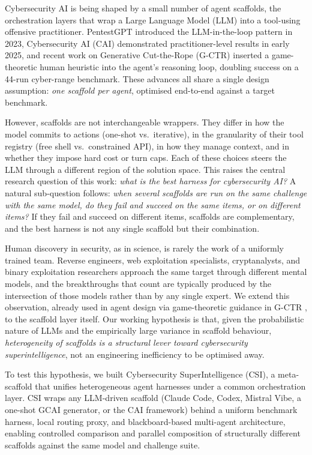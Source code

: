Cybersecurity AI is being shaped by a small number of agent scaffolds, the orchestration layers that wrap a Large Language Model (LLM) into a tool-using offensive practitioner. PentestGPT \cite{deng2024pentestgpt,mayoral2025offensive} introduced the LLM-in-the-loop pattern in 2023, Cybersecurity AI (CAI) \cite{mayoral2025cai} demonstrated practitioner-level results in early 2025, and recent work on Generative Cut-the-Rope (G-CTR) \cite{mayoralvilches2025gametheoretic} inserted a game-theoretic human heuristic into the agent's reasoning loop, doubling success on a 44-run cyber-range benchmark. These advances all share a single design assumption: \emph{one scaffold per agent}, optimised end-to-end against a target benchmark.

However, scaffolds are not interchangeable wrappers. They differ in how the model commits to actions (one-shot vs.\ iterative), in the granularity of their tool registry (free shell vs.\ constrained API), in how they manage context, and in whether they impose hard cost or turn caps. Each of these choices steers the LLM through a different region of the solution space. This raises the central research question of this work: \emph{what is the best harness for cybersecurity AI?} A natural sub-question follows: \emph{when several scaffolds are run on the same challenge with the same model, do they fail and succeed on the same items, or on different items?} If they fail and succeed on different items, scaffolds are complementary, and the best harness is not any single scaffold but their combination.


Human discovery in security, as in science, is rarely the work of a uniformly trained team. Reverse engineers, web exploitation specialists, cryptanalysts, and binary exploitation researchers approach the same target through different mental models, and the breakthroughs that count are typically produced by the intersection of those models rather than by any single expert. We extend this observation, already used in agent design via game-theoretic guidance in G-CTR \cite{mayoralvilches2025gametheoretic}, to the scaffold layer itself. Our working hypothesis is that, given the probabilistic nature of LLMs and the empirically large variance in scaffold behaviour, \emph{heterogeneity of scaffolds is a structural lever toward cybersecurity superintelligence}, not an engineering inefficiency to be optimised away.

To test this hypothesis, we built Cybersecurity SuperIntelligence (CSI), a meta-scaffold that unifies heterogeneous agent harnesses under a common orchestration layer. CSI wraps any LLM-driven scaffold (Claude Code, Codex, Mistral Vibe, a one-shot GCAI generator, or the CAI framework) behind a uniform benchmark harness, local routing proxy, and blackboard-based multi-agent architecture, enabling controlled comparison and parallel composition of structurally different scaffolds against the same model and challenge suite.

